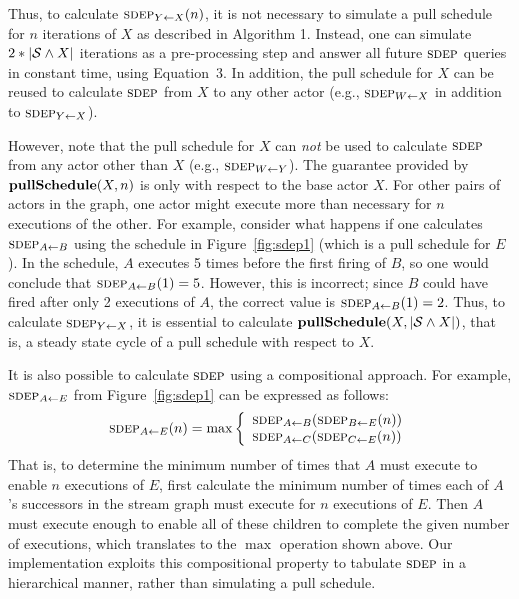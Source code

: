 \documentclass{sig-alternate}
\begin{document}

Thus, to calculate $\sdepf{Y}{X}(n)$, it is not necessary to simulate
a pull schedule for $n$ iterations of $X$ as described in Algorithm 1.
Instead, one can simulate $2 * |{\cal S} \wedge X|$ iterations as a
pre-processing step and answer all future $\textsc{sdep}$ queries in constant
time, using Equation~3.  In addition, the pull schedule for $X$ can be
reused to calculate $\textsc{sdep}$ from $X$ to any other actor (e.g.,
$\sdepf{W}{X}$ in addition to $\sdepf{Y}{X}$).

However, note that the pull schedule for $X$ can {\it not} be used to
calculate $\textsc{sdep}$ from any actor other than $X$ (e.g.,
$\sdepf{W}{Y}$).  The guarantee provided by ${\bf pullSchedule}(X, n)$
is only with respect to the base actor $X$. For other pairs of actors
in the graph, one actor might execute more than necessary for $n$
executions of the other.  For example, consider what happens if one
calculates $\sdepf{A}{B}$ using the schedule in Figure~\ref{fig:sdep1}
(which is a pull schedule for $E$).  In the schedule, $A$ executes 5
times before the first firing of $B$, so one would conclude that
$\sdepf{A}{B}(1) = 5$.  However, this is incorrect; since $B$ could
have fired after only 2 executions of $A$, the correct value is
$\sdepf{A}{B}(1) = 2$.  Thus, to calculate $\sdepf{Y}{X}$, it is
essential to calculate ${\bf pullSchedule}(X, |{\cal S} \wedge X|)$,
that is, a steady state cycle of a pull schedule with respect to $X$.

It is also possible to calculate $\textsc{sdep}$ using a compositional
approach.  For example, $\sdepf{A}{E}$ from Figure~\ref{fig:sdep1} can
be expressed as follows: ~\vspace{-3pt}~
\begin{equation*}
\begin{array}{rl}
\sdepf{A}{E}(n) = \max \left\{\begin{array}{l}
\sdepf{A}{B} ( \sdepf{B}{E}(n) ) \\
\sdepf{A}{C} ( \sdepf{C}{E}(n) )
\end{array}\right.
\end{array}
\end{equation*}
That is, to determine the minimum number of times that $A$ must
execute to enable $n$ executions of $E$, first calculate the minimum
number of times each of $A$'s successors in the stream graph must
execute for $n$ executions of $E$.  Then $A$ must execute enough to
enable all of these children to complete the given number of
executions, which translates to the $\max$ operation shown above.  Our
implementation exploits this compositional property to tabulate
$\textsc{sdep}$ in a hierarchical manner, rather than simulating a pull
schedule.
\end{document}
